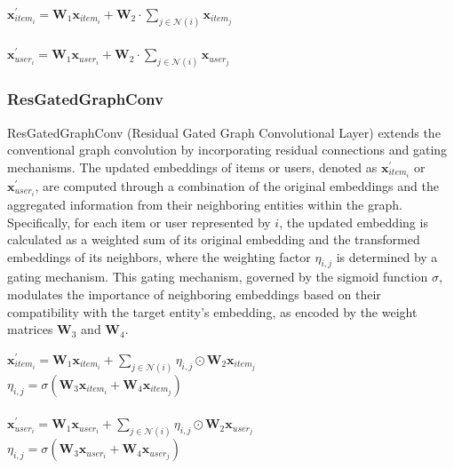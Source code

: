 \documentclass[bst/sn-nature]{sn-jnl}
\begin{document}
\begin{multicols}{2}
\begin{center}
    $\mathbf{x}^{\prime}_{item_{i}} = \mathbf{W}_1 \mathbf{x}_{item_{i}} + \mathbf{W}_2 \cdot \sum_{j \in \mathcal{N}(i)} \mathbf{x}_{item_{j}}$ \\~\\
    $\mathbf{x}^{\prime}_{user_{i}} = \mathbf{W}_1 \mathbf{x}_{user_{i}} + \mathbf{W}_2 \cdot \sum_{j \in \mathcal{N}(i)} \mathbf{x}_{user_{j}}$
\end{center}

\subsubsection{ResGatedGraphConv\cite{resgatedgraphconv}} 

\quad ResGatedGraphConv (Residual Gated Graph Convolutional Layer) extends the conventional graph convolution by incorporating residual connections and gating mechanisms. The updated embeddings of items or users, denoted as $\mathbf{x}^{\prime}_{item_i}$ or $\mathbf{x}^{\prime}_{user_i}$, are computed through a combination of the original embeddings and the aggregated information from their neighboring entities within the graph. Specifically, for each item or user represented by $i$, the updated embedding is calculated as a weighted sum of its original embedding and the transformed embeddings of its neighbors, where the weighting factor $\eta_{i,j}$ is determined by a gating mechanism. This gating mechanism, governed by the sigmoid function $\sigma$, modulates the importance of neighboring embeddings based on their compatibility with the target entity's embedding, as encoded by the weight matrices $\mathbf{W}_3$ and $\mathbf{W}_4$. \\ 

\begin{center}
    $\mathbf{x}^{\prime}_{item_{i}} = \mathbf{W}_1 \mathbf{x}_{item_{i}} + \sum_{j \in \mathcal{N}(i)} \eta_{i,j} \odot \mathbf{W}_2 \mathbf{x}_{item_{j}}$\\ 
    $\eta_{i,j} = \sigma(\mathbf{W}_3 \mathbf{x}_{item_{i}} + \mathbf{W}_4
    \mathbf{x}_{item_{j}})$ \\~\\
    $\mathbf{x}^{\prime}_{user_{i}} = \mathbf{W}_1 \mathbf{x}_{user_{i}} + \sum_{j \in \mathcal{N}(i)} \eta_{i,j} \odot \mathbf{W}_2 \mathbf{x}_{user_{j}}$\\ 
    $\eta_{i,j} = \sigma(\mathbf{W}_3 \mathbf{x}_{user_{i}} + \mathbf{W}_4
    \mathbf{x}_{user_{j}})$
\end{center}



\end{multicols}
\end{document}
